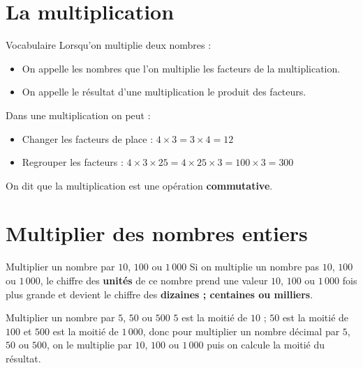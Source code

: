 
\begin{pageCours} %


\section{La multiplication}

\begin{DefT}{Vocabulaire}
Lorsqu'on multiplie deux nombres :
\begin{itemize}
\item On appelle les nombres que l’on multiplie les facteurs de la multiplication.
\item On appelle le résultat d’une multiplication le produit des facteurs.
\end{itemize}
\end{DefT}

\begin{Pp}
Dans une multiplication on peut :
\begin{itemize}
    \item Changer les facteurs de place : $4\times3=3\times4=12$
    \item Regrouper les facteurs : $4\times3\times25=4\times25\times3=100\times3=300$
\end{itemize}
On dit que la multiplication est une opération \textbf{commutative}.
\end{Pp}

\section{Multiplier des nombres entiers}

\begin{MtT}{{Multiplier un nombre par $10$, $100$ ou $1\, 000$}}
Si on multiplie un nombre pas $10$, $100$ ou $1\, 000$, le chiffre des \textbf{unités} de ce nombre prend une valeur $10$, $100$ ou $1\, 000$ fois plus grande et devient le chiffre des \textbf{dizaines ; centaines ou milliers}.
\end{MtT}

\begin{MtT}{{Multiplier un nombre par $5$, $50$ ou $500$}}
$5$ est la moitié de $10$ ; $50$ est la moitié de $100$ et $500$ est la moitié de $1\,000$, donc pour multiplier un nombre décimal par $5$, $50$ ou $500$, on le multiplie par $10$, $100$ ou $1\, 000$ puis on calcule la moitié du résultat.
\end{MtT}


\end{pageCours}
